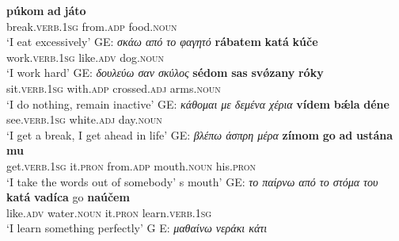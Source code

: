 \documentclass[output=paper,colorlinks,citecolor=brown]{langscibook}
\begin{document}
\begin{xlist}
\ex
\gll \textbf{{púkom}} \textbf{{ad}} \textbf{{játo}}\\
break.\textsc{verb.1sg}  from.\textsc{adp} food.\textsc{noun}\\
\glt `I eat excessively' GE: \textit{σκάω από το φαγητό}
\ex
\gll \textbf{{rábatem}} \textbf{{katá}} \textbf{{kúče}} \\
work.\textsc{verb.1sg}  like.\textsc{adv}  dog.\textsc{noun}\\
\glt `I work hard' GE: \textit{δουλεύω σαν σκύλος}
\ex
\gll \textbf{{sédom}} \textbf{{sas}} \textbf{{svǿzany}} \textbf{{róky}} \\
sit.\textsc{verb.1sg}  with.\textsc{adp} crossed.\textsc{adj} arms.\textsc{noun} \\
\glt `I do nothing, remain inactive' GE: \textit{ κάθομαι με δεμένα χέρια}
\ex 
\gll \textbf{{vídem}} \textbf{{bǽla}} \textbf{{déne}} \\
see.\textsc{verb.1sg}   white.\textsc{adj} day.\textsc{noun}\\
\glt `I get a break, I get ahead in life' GE: \textit{ βλέπω άσπρη μέρα}
\ex 
\gll \textbf{{zímom}} \textbf{{go}} \textbf{{ad}} \textbf{{ustána}} \textbf{{mu}}\\
get.\textsc{verb.1sg}  it.\textsc{pron} from.\textsc{adp}  mouth.\textsc{noun} his.\textsc{pron}\\
\glt `I take the words out of somebody' s mouth' GE: \textit{το παίρνω από το στόμα του} 
\ex 
\gll \textbf{{katá}} \textbf{{vadíca}} go \textbf{{naúčem}} \\
like.\textsc{adv} water.\textsc{noun} it.\textsc{pron} learn.\textsc{verb.1sg}   \\
\glt `I learn something perfectly' G E: \textit{ μαθαίνω νεράκι κάτι}


\end{xlist}
\end{document}
